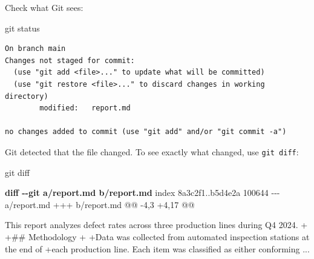 \documentclass[
  letterpaper,
  DIV=11,
  numbers=noendperiod]{scrreprt}
\newenvironment{Shaded}{\begin{snugshade}}{\end{snugshade}}
\newcommand{\DataTypeTok}[1]{\textcolor[rgb]{0.68,0.00,0.00}{#1}}
\newcommand{\FunctionTok}[1]{\textcolor[rgb]{0.28,0.35,0.67}{#1}}
\newcommand{\KeywordTok}[1]{\textcolor[rgb]{0.00,0.23,0.31}{\textbf{#1}}}
\newcommand{\NormalTok}[1]{\textcolor[rgb]{0.00,0.23,0.31}{#1}}
\newcommand{\VariableTok}[1]{\textcolor[rgb]{0.07,0.07,0.07}{#1}}
\begin{document}
Check what Git sees:

\begin{codelisting}

\caption{\texttt{terminal}}

\begin{Shaded}
\begin{Highlighting}[]
\FunctionTok{git}\NormalTok{ status}
\end{Highlighting}
\end{Shaded}

\end{codelisting}

\begin{verbatim}
On branch main
Changes not staged for commit:
  (use "git add <file>..." to update what will be committed)
  (use "git restore <file>..." to discard changes in working directory)
        modified:   report.md

no changes added to commit (use "git add" and/or "git commit -a")
\end{verbatim}

Git detected that the file changed. To see exactly what changed, use
\texttt{git\ diff}:

\begin{codelisting}

\caption{\texttt{terminal}}

\begin{Shaded}
\begin{Highlighting}[]
\FunctionTok{git}\NormalTok{ diff}
\end{Highlighting}
\end{Shaded}

\end{codelisting}

\begin{Shaded}
\begin{Highlighting}[]
\KeywordTok{diff {-}{-}git a/report.md b/report.md}
\NormalTok{index 8a3c2f1..b5d4e2a 100644}
\DataTypeTok{{-}{-}{-} a/report.md}
\DataTypeTok{+++ b/report.md}
\DataTypeTok{@@ {-}4,3 +4,17 @@}

\NormalTok{ This report analyzes defect rates across three production lines}
\NormalTok{ during Q4 2024.}
\VariableTok{+}
\VariableTok{+\#\# Methodology}
\VariableTok{+}
\VariableTok{+Data was collected from automated inspection stations at the end of}
\VariableTok{+each production line. Each item was classified as either conforming}
\NormalTok{...}
\end{Highlighting}
\end{Shaded}
\end{document}
